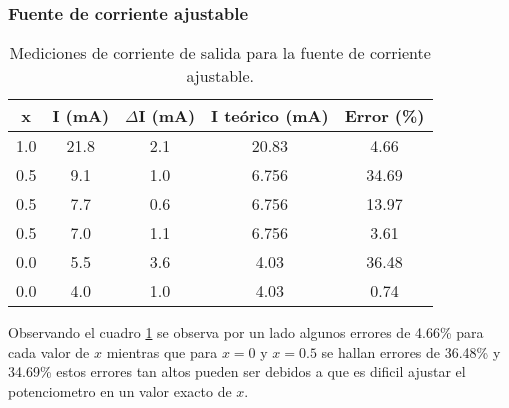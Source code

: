 \subsubsection{Fuente de corriente ajustable}

\begin{table}[ht]
    \centering
    \begin{tabular}{|c|c|c|c|c|}
        \hline
        x & I (mA) & $\Delta$I (mA) & I teórico (mA) & Error (\%) \\
        \hline
        1.0 & 21.8 & 2.1 & 20.83 & 4.66 \\
        0.5 & 9.1 & 1.0 & 6.756 & 34.69 \\
        0.5 & 7.7 & 0.6 & 6.756 & 13.97 \\
        0.5 & 7.0 & 1.1 & 6.756 & 3.61 \\
        0.0 & 5.5 & 3.6 & 4.03 & 36.48 \\
        0.0 & 4.0 & 1.0 & 4.03 & 0.74 \\
        \hline
    \end{tabular}
    \caption{Mediciones de corriente de salida para la fuente de corriente ajustable.}
    \label{tab:error-mediciones-fuente-corriente-ajustable}
\end{table}

Observando el cuadro \ref{tab:error-mediciones-fuente-corriente-ajustable} se observa por un lado algunos errores de 4.66\% para cada valor de $x$ mientras que para $x=0$ y $x=0.5$ se hallan errores de 36.48\% y 34.69\% estos errores tan altos pueden ser debidos a que es dificil ajustar el potenciometro en un valor exacto de $x$.